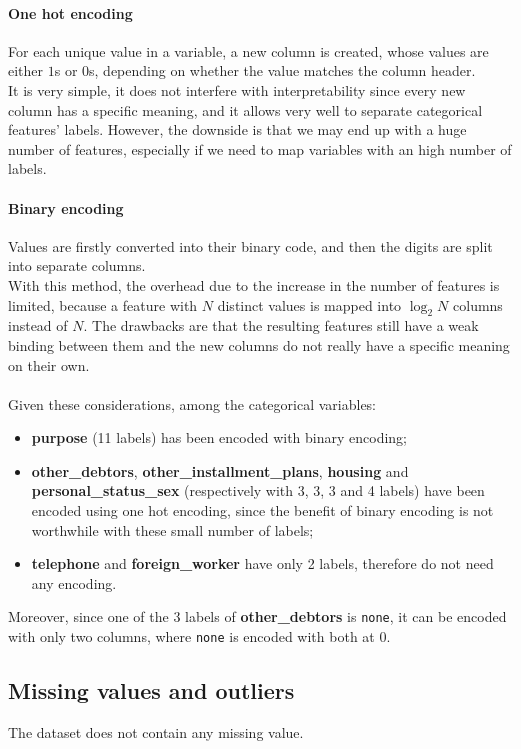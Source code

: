 \documentclass[letterpaper]{article}
\begin{document}
	\paragraph{One hot encoding} For each unique value in a variable, a new column is created, whose values are either $1$s or $0$s, depending on whether the value matches the column header. \\ It is very simple, it does not interfere with interpretability since every new column has a specific meaning, and it allows very well to separate categorical features' labels. However, the downside is that we may end up with a huge number of features, especially if we need to map variables with an high number of labels.
	\paragraph{Binary encoding} Values are firstly converted into their binary code, and then the digits are split into separate columns. \\ With this method, the overhead due to the increase in the number of features is limited, because a feature with $N$ distinct values is mapped into $\log_2N$ columns instead of $N$. The drawbacks are that the resulting features still have a weak binding between them and the new columns do not really have a specific meaning on their own. 
	\paragraph{} Given these considerations, among the categorical variables:
	\begin{itemize}
		\item \textbf{purpose} (11 labels) has been encoded with binary encoding;
		\item \textbf{other\_debtors}, \textbf{other\_installment\_plans}, \textbf{housing} and \textbf{personal\_status\_sex} (respectively with 3, 3, 3 and 4 labels) have been encoded using one hot encoding, since the benefit of binary encoding is not worthwhile with these small number of labels;
		\item \textbf{telephone} and \textbf{foreign\_worker} have only 2 labels, therefore do not need any encoding.
	\end{itemize}
	Moreover, since one of the 3 labels of \textbf{other\_debtors} is \texttt{none}, it can be encoded with only two columns, where \texttt{none} is encoded with both at $0$.
	
	\subsection{Missing values and outliers} \label{outliers}
	The dataset does not contain any missing value.
\end{document}
